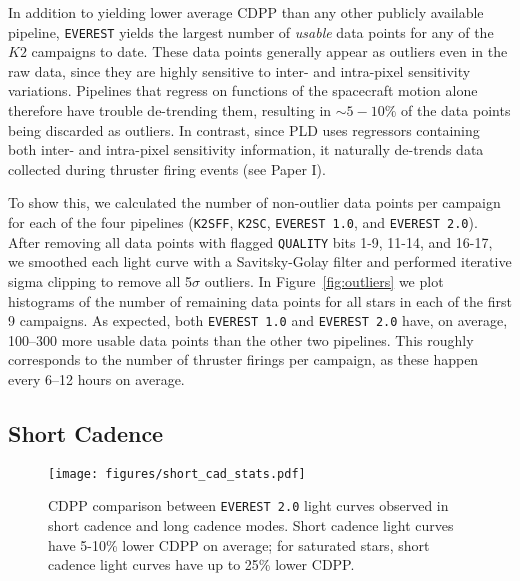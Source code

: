\documentclass[]{emulateapj}
\begin{document}
In addition to yielding lower average CDPP than any other publicly available pipeline,
\texttt{EVEREST} yields the largest number of \emph{usable} data points for any of the
$K2$ campaigns to date. These data points generally appear as outliers even in the
raw data, since they are highly sensitive to inter- and intra-pixel sensitivity variations.
Pipelines that regress on functions of the spacecraft motion alone therefore have trouble
de-trending them, resulting in ${\sim}5-10\%$ of the data points being discarded as outliers.
In contrast, since PLD uses regressors containing both inter- and intra-pixel sensitivity
information, it naturally de-trends data collected during thruster firing events (see Paper I).

To show this, we calculated the number of non-outlier data points per campaign
for each of the four pipelines (\texttt{K2SFF}, \texttt{K2SC}, \texttt{EVEREST 1.0}, and
\texttt{EVEREST 2.0}). After removing all data points with flagged \texttt{QUALITY}
bits 1-9, 11-14, and 16-17, we smoothed each light curve with a Savitsky-Golay filter and
performed iterative sigma clipping to remove all 5$\sigma$ outliers. In Figure~\ref{fig:outliers}
we plot histograms of the number of remaining data points for all stars in each of the first
9 campaigns. As expected, both \texttt{EVEREST 1.0} and \texttt{EVEREST 2.0} have, on
average, 100--300 more usable data points than the other two pipelines. This roughly
corresponds to the number of thruster firings per campaign, as these happen every 6--12
hours on average.

\subsection{Short Cadence}
\label{sec:shortcad}

\begin{figure}[hbt]
  \begin{center}
      \texttt{[image: figures/short\_cad\_stats.pdf]}
       \caption{CDPP comparison between \texttt{EVEREST 2.0} light curves
       observed in short cadence and long cadence modes. Short cadence
       light curves have 5-10\% lower CDPP on average; for saturated stars,
       short cadence light curves have up to 25\% lower CDPP.}
     \label{fig:short_cad_stats}
  \end{center}
\end{figure}
\end{document}
